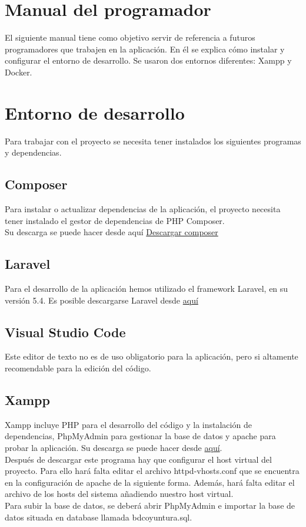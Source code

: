\section{Manual del programador}
El siguiente manual tiene como objetivo servir de referencia a futuros programadores que trabajen en la aplicación. En él se explica cómo instalar y configurar el entorno de desarrollo. Se usaron dos entornos diferentes: Xampp y Docker.
\section{Entorno de desarrollo}
Para trabajar con el proyecto se necesita tener instalados los siguientes
programas y dependencias.
\subsection{Composer}
Para instalar o actualizar dependencias de la aplicación, el proyecto necesita tener instalado el gestor de dependencias de PHP Composer.\\
Su descarga se puede hacer desde aquí \href{https://getcomposer.org/}{Descargar composer}
\subsection{Laravel}
Para el desarrollo de la aplicación hemos utilizado el framework Laravel, en su versión 5.4. Es posible descargarse Laravel desde \href{https://laravel.com/}{aquí}
\subsection{Visual Studio Code}
Este editor de texto no es de uso obligatorio para la aplicación, pero si altamente recomendable para la edición del código.
\subsection{Xampp}
Xampp incluye PHP para el desarrollo del código y la instalación de dependencias, PhpMyAdmin para gestionar la base de datos y apache para probar la aplicación. Su descarga se puede hacer desde \href{https://www.apachefriends.org/es/download.html}{aquí}.\\
Después de descargar este programa hay que configurar el host virtual del proyecto. Para ello hará falta editar el archivo httpd-vhosts.conf que se encuentra en la configuración de apache de la siguiente forma.
Además, hará falta editar el archivo de los hosts del sistema añadiendo nuestro host virtual.\\
Para subir la base de datos, se deberá abrir PhpMyAdmin e importar la base de datos situada en database llamada bdcoyuntura.sql.
